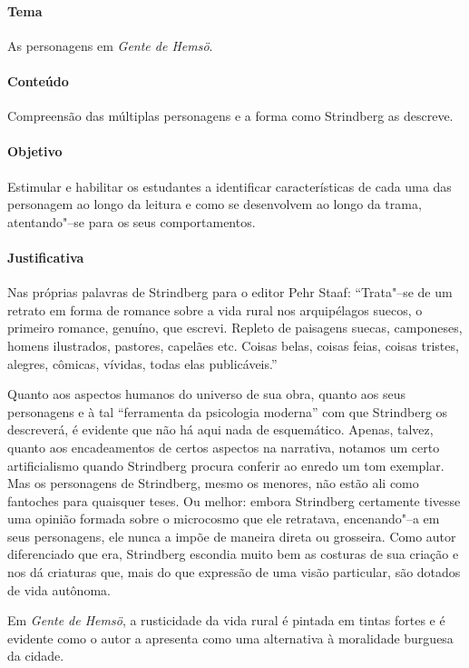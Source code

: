 \documentclass[12pt]{extarticle}
\begin{document}
\paragraph{Tema} As personagens em \textit{Gente de Hemsö}.

\paragraph{Conteúdo} Compreensão das múltiplas personagens e a forma 
como Strindberg as descreve.

\paragraph{Objetivo} Estimular e habilitar os estudantes a identificar características 
de cada uma das personagem ao longo da leitura e como se desenvolvem ao 
longo da trama, atentando"--se para os seus comportamentos. 

\paragraph{Justificativa} Nas próprias palavras de Strindberg para o editor 
Pehr Staaf: ``Trata"--se de um retrato em forma de romance sobre a vida 
rural nos arquipélagos suecos, o primeiro romance, genuíno, que escrevi.
Repleto de paisagens suecas, camponeses, homens ilustrados,
pastores, capelães etc. Coisas belas, coisas feias, coisas tristes,
alegres, cômicas, vívidas, todas elas publicáveis.''

Quanto aos aspectos humanos do universo de sua obra, quanto
aos seus personagens e à tal “ferramenta da psicologia moderna”
com que Strindberg os descreverá, é evidente que
não há aqui nada de esquemático. Apenas, talvez, quanto
aos encadeamentos de certos aspectos na narrativa, notamos
um certo artificialismo quando Strindberg procura conferir
ao enredo um tom exemplar. Mas os personagens de
Strindberg, mesmo os menores, não estão ali como fantoches para quaisquer 
teses. Ou melhor: embora Strindberg certamente tivesse uma opinião formada 
sobre o microcosmo que ele retratava, encenando"--a em seus personagens,
ele nunca a impõe de maneira direta ou grosseira. Como
autor diferenciado que era, Strindberg escondia muito bem
as costuras de sua criação e nos dá criaturas que, mais do
que expressão de uma visão particular, são dotados de vida
autônoma.

Em \textit{Gente de Hemsö}, a rusticidade da vida rural é pintada em tintas
fortes e é evidente como o autor a apresenta como uma
alternativa à moralidade burguesa da cidade. 
\end{document}
